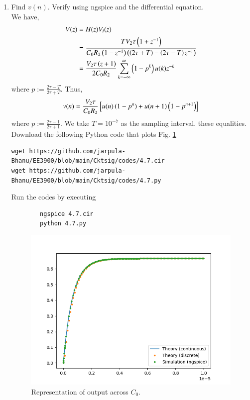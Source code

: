\documentclass[journal,12pt,twocolumn]{IEEEtran}
\renewcommand\thesection{\arabic{section}}
\begin{document}
\begin{enumerate}[label=\thesection.\arabic*.,ref=\thesection.\theenumi]
\item Find $v(n)$. Verify using ngspice and the differential equation.\\
\solution We have,
\begin{align}
    V(z) &= H(z)V_i(z) \\
         &= \frac{TV_2\tau\left(1+z^{-1}\right)}{C_0R_2\left(1-z^{-1}\right)\left(\left(2\tau+T\right)-\left(2\tau-T\right)z^{-1}\right)} \\
         &= \frac{V_2\tau\left(z+1\right)}{2C_0R_2}\sum_{k=-\infty}^{\infty}\left(1-p^k\right)u(k)z^{-k}
\end{align}
where $p := \frac{2\tau-T}{2\tau+T}$. Thus,
\begin{align}
    v(n) = \frac{V_2\tau}{C_0R_2}{}\left[u(n)\left(1-p^n\right)+u(n+1)\left(1-p^{n+1}\right)\right]
\end{align}
where $p := \frac{2\tau-1}{2\tau+1}$. We take $T = 10^{-7}$ as the
sampling interval. 
these equalities.\\
Download the following Python code that plots Fig. \ref{fig:vc0}
            \begin{lstlisting}
wget https://github.com/jarpula-Bhanu/EE3900/blob/main/Cktsig/codes/4.7.cir
wget https://github.com/jarpula-Bhanu/EE3900/blob/main/Cktsig/codes/4.7.py
            \end{lstlisting}
            
    Run the codes by executing
    \begin{lstlisting}
        ngspice 4.7.cir
        python 4.7.py
    \end{lstlisting}
\begin{figure}[!ht]
    \includegraphics[width=\columnwidth]{figs/4.7.png}
    \caption{Representation of output across $C_0$.}
    \label{fig:vc0}
\end{figure}
            \end{enumerate}
\end{document}
